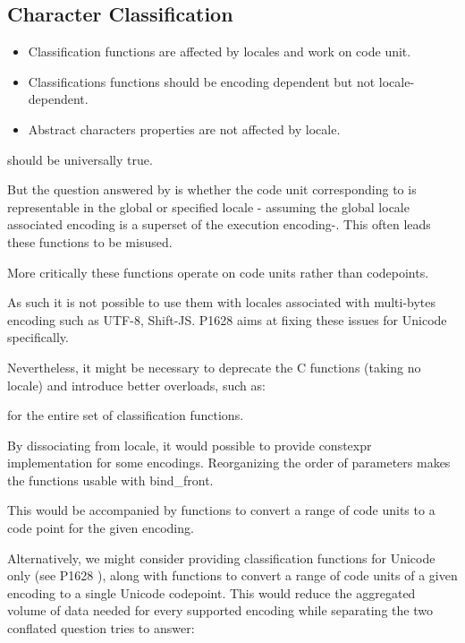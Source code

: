 \documentclass{wg21}
\newcommand{\UnicodeLetter}[1]{\textbf{\textcolor{BrickRed}{\Large\tcode{#1}}}}
\begin{document}
\subsection{Character Classification}
\begin{itemize}
    \item Classification functions are affected by locales and work on code unit.
    \item Classifications functions should be encoding dependent but not locale-dependent.
    \item Abstract characters properties are not affected by locale.
\end{itemize}

 should be universally true.

But the question answered by  is whether the code unit corresponding to \UnicodeLetter{a} is representable in the global or specified locale - assuming the global locale associated encoding is a superset of the execution encoding-.
This often leads these functions to be misused.

More critically these functions operate on code units rather than codepoints.

As such it is not possible to use them with locales associated with multi-bytes encoding such as UTF-8, Shift-JS.
P1628 aims at fixing these issues for Unicode specifically.

Nevertheless, it might be necessary to deprecate the C functions (taking no locale) and introduce better overloads, such as:


for the entire set of classification functions.

By dissociating from locale, it would possible to provide constexpr implementation for some encodings.
Reorganizing the order of parameters makes the functions usable with bind\_front.

This would be accompanied by functions to convert a range of code units to a code point for the given encoding.

Alternatively, we might consider providing classification functions for Unicode only (see P1628 \cite{P1628R0}), along with functions to convert a range of code units of a given encoding to a single Unicode codepoint. This would reduce the aggregated volume of data needed for every supported encoding while separating the two conflated question  tries to answer:
\end{document}
